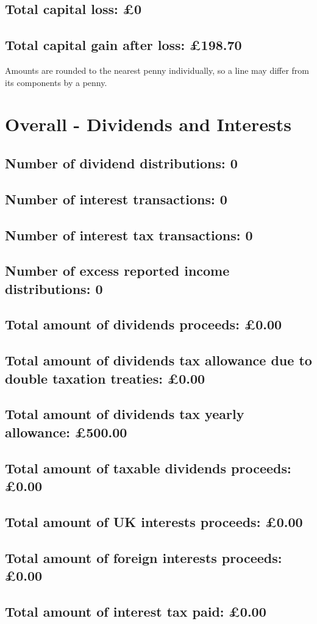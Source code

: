 \documentclass{article}
\begin{document}
\subsection*{Total capital loss: £0}
\subsection*{Total capital gain after loss: £198.70}
\vspace{1em}
Amounts are rounded to the nearest penny individually, so a line may differ from its components by a penny.
\vspace{2em}
\section*{Overall - Dividends and Interests}
\subsection*{Number of dividend distributions: 0}
\subsection*{Number of interest transactions: 0}
\subsection*{Number of interest tax transactions: 0}
\subsection*{Number of excess reported income distributions: 0}
\subsection*{Total amount of dividends proceeds: £0.00}
\subsection*{Total amount of dividends tax allowance due to double taxation treaties: £0.00}
\subsection*{Total amount of dividends tax yearly allowance: £500.00}
\subsection*{Total amount of taxable dividends proceeds: £0.00}
\subsection*{Total amount of UK interests proceeds: £0.00}
\subsection*{Total amount of foreign interests proceeds: £0.00}
\subsection*{Total amount of interest tax paid: £0.00}
\end{document}
